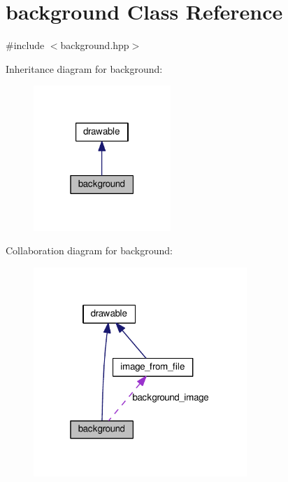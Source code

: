 \hypertarget{classbackground}{}\section{background Class Reference}
\label{classbackground}


{\ttfamily \#include $<$background.\+hpp$>$}



Inheritance diagram for background\+:\nopagebreak
\begin{figure}[H]
\begin{center}
\leavevmode
\includegraphics[width=147pt]{classbackground__inherit__graph}
\end{center}
\end{figure}


Collaboration diagram for background\+:\nopagebreak
\begin{figure}[H]
\begin{center}
\leavevmode
\includegraphics[width=229pt]{classbackground__coll__graph}
\end{center}
\end{figure}
